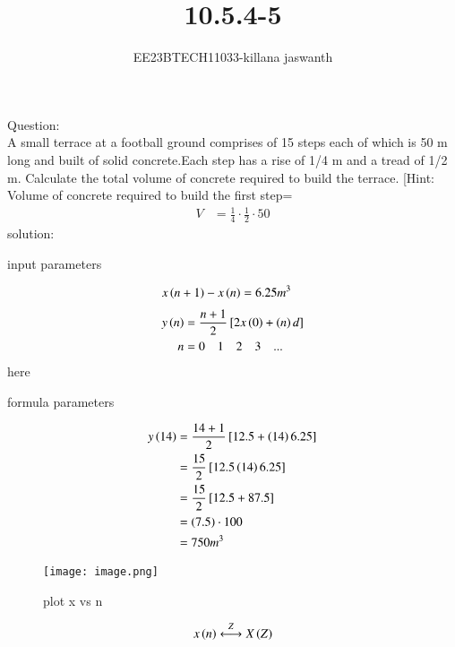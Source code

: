 \documentclass[journal,12pt,twocolumn]{IEEEtran}
\theoremstyle{remark}
\begin{document}

\vspace{3cm}

\title{10.5.4-5}
\author{EE23BTECH11033-killana jaswanth}
\maketitle
\newpage

\bigskip

\renewcommand{\thefigure}{\theenumi}
\renewcommand{\thetable}{\theenumi}
Question:\\
A small terrace at a football ground comprises of 15 steps each of which is 50
m long and built of solid concrete.Each step has a rise of 1/4 m and a tread of
1/2 m. Calculate the total volume of concrete required to build the terrace.
[Hint: Volume of concrete required to build the first step=\begin{align}
    V&=\frac{1}{4} \cdot \frac{1}{2} \cdot 50 
\end{align}
solution:
\begin{table}[!ht]
 \centering
  
   \caption{input parameters}
   \label{tab:10.5.4.5}
   \end{table}
\begin{align}
x\left(n+1\right)-x\left(n\right)&=6.25m^3
\end{align}
\begin{align}
y\left(n\right) &= \frac{n+1}{2} {}\left[2x\left(0\right)+\left(n\right)d\right] \\ 
n&=0\quad1\quad2\quad3\quad...
\end{align}
here\begin{table}[!ht]
 \centering
  
   \caption{formula parameters}
   \label{tab:10.5.4.5}
   \end{table}
\begin{align}
y\left(14\right) &= \frac{14+1}{2} {}\left[12.5+\left(14\right)6.25\right]\\
 &= \frac{15}{2}{}\left[12.5\left(14\right)6.25\right]\\
&= \frac{15}{2} {}\left[12.5+87.5\right]\\
   &=\left(7.5\right) \cdot 100\\
   &=750m^3
   \end{align}
\begin{figure}[!ht]
    \centering
    \texttt{[image: image.png]}
    \caption{plot x vs n}
    \label{fig:enter-label}
\end{figure}
\begin{align}
x\left(n\right)\overset{Z}{\longleftrightarrow}  X\left(Z\right)
\end{align}
\end{document}
